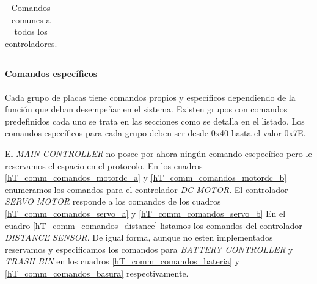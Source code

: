 \begin{table}[ht]
\begin{center}
\begin{tabular}{|l|}
			\hline
		\end{tabular}
		\caption{Comandos comunes a todos los controladores. }
		\label{hT_comm_comandos_comunes}
	\end{center}
\end{table}

\paragraph{Comandos espec\'ificos}
\label{h_comm_protocolo_comandosEspecificos}

Cada grupo de placas tiene comandos propios y espec\'ificos dependiendo de la funci\'on que deban desempe\~nar en el sistema.
Existen grupos con comandos predefinidos cada uno se trata en las secciones como se detalla en el listado.
Los comandos espec\'ificos para cada grupo deben ser desde 0x40 hasta el valor 0x7E.

El \emph{MAIN CONTROLLER} no posee por ahora ning\'un comando escpec\'ifico pero le reservamos el espacio en el protocolo.
En los cuadros \ref{hT_comm_comandos_motordc_a} y \ref{hT_comm_comandos_motordc_b} enumeramos los comandos para el
controlador \emph{DC MOTOR}.
El controlador \emph{SERVO MOTOR} responde a los comandos de los cuadros \ref{hT_comm_comandos_servo_a}
y \ref{hT_comm_comandos_servo_b}
En el cuadro \ref{hT_comm_comandos_distance} listamos los comandos del controlador \emph{DISTANCE SENSOR}.
De igual forma, aunque no esten implementados reservamos y especificamos los comandos para \emph{BATTERY CONTROLLER} y
\emph{TRASH BIN} en los cuadros \ref{hT_comm_comandos_bateria} y \ref{hT_comm_comandos_basura} respectivamente.


